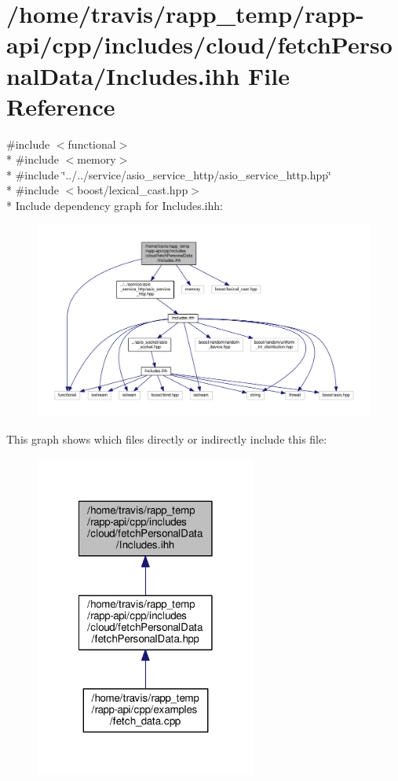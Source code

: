 \hypertarget{cloud_2fetchPersonalData_2Includes_8ihh}{\section{/home/travis/rapp\-\_\-temp/rapp-\/api/cpp/includes/cloud/fetch\-Personal\-Data/\-Includes.ihh File Reference}
\label{cloud_2fetchPersonalData_2Includes_8ihh}
}
{\ttfamily \#include $<$functional$>$}\\*
{\ttfamily \#include $<$memory$>$}\\*
{\ttfamily \#include \char`\"{}../../service/asio\-\_\-service\-\_\-http/asio\-\_\-service\-\_\-http.\-hpp\char`\"{}}\\*
{\ttfamily \#include $<$boost/lexical\-\_\-cast.\-hpp$>$}\\*
Include dependency graph for Includes.\-ihh\-:
\nopagebreak
\begin{figure}[H]
\begin{center}
\leavevmode
\includegraphics[width=350pt]{cloud_2fetchPersonalData_2Includes_8ihh__incl}
\end{center}
\end{figure}
This graph shows which files directly or indirectly include this file\-:
\nopagebreak
\begin{figure}[H]
\begin{center}
\leavevmode
\includegraphics[width=206pt]{cloud_2fetchPersonalData_2Includes_8ihh__dep__incl}
\end{center}
\end{figure}
